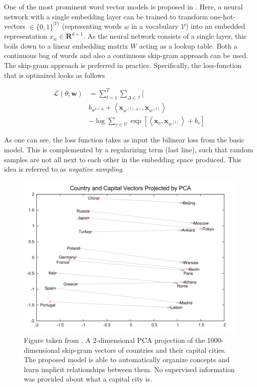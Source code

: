 \documentclass[a4paper,12pt,oneside,openright]{report}
\begin{document}
One of the most prominent word vector models is proposed in \cite{mikolov13, mikolov13b}.
Here, a neural network with a single embedding layer can be trained to transform one-hot-vectors $\in \{ 0, 1 \}^{| \mathcal{V} |}$ (representing words $w$ in a vocabulary $\mathcal{V}$)
into an embedded representation $x_w \in \mathbf{R}^{d + 1}$.
As the neural network consists of a single layer, this boils down to a linear embedding matrix $W$ acting as a lookup table.
Both a continuous bag of words and also a continuous skip-gram approach can be used.
The skip-gram approach is preferred in practice.
Specifically, the loss-function that is optimized looks as follows

\begin{align} 
\mathcal{L}(\theta ; \mathbf{w}) & =\sum_{t=1}^{T} \sum_{\Delta \in \mathcal{I}} [ \nonumber \\ 
& b_{w^{t+\Delta}} +\left\langle \mathbf{x}_{w^{(t+\Delta)}}, \mathbf{x}_{w^{(t)}} \right\rangle \nonumber  \\
& -\log \sum_{v \in \mathcal{V}} \exp \left[\left\langle\mathbf{x}_{v}, \mathbf{x}_{w^{(t)}}\right\rangle+b_{v} \right] 
\end{align}

As one can see, the loss function takes as input the bilinear loss from the basic model.
This is complemented by a regularizing term (last line), such that random samples are not all next to each other in the embedding space produced.
This idea is referred to as \textit{negative sampling}.

\begin{figure}[h]
	\center
  \includegraphics[width=0.6\linewidth]{./assets/background/word2vec_cities.png}
  \caption{Figure taken from \cite{mikolov13b}. A 2-dimensional PCA projection of the 1000-dimensional skip-gram vectors of countries and their capital cities. The proposed model is able to automatically organize concepts and learn implicit relationships between them. No supervised information was provided about what a capital city is.}
  \label{fig:cbow_skipgram}
\end{figure}
\end{document}
